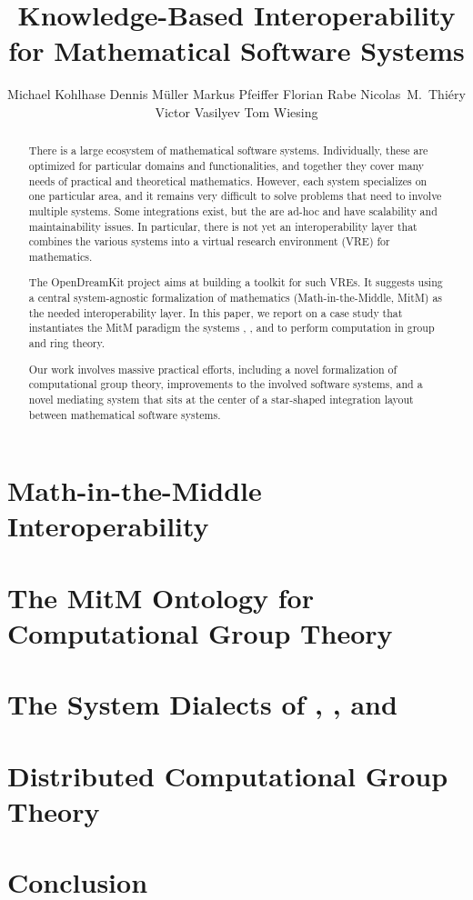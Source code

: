 \documentclass{llncs}
\title{Knowledge-Based Interoperability for Mathematical Software Systems}
\author{
Michael Kohlhase\inst{1} 
Dennis M\"uller\inst{1} 
Markus Pfeiffer\inst{3} 
Florian Rabe\inst{2} 
Nicolas~M.~Thiéry\inst{4} 
Victor Vasilyev\inst{3} 
Tom Wiesing\inst{1}
}
\institute{
   FAU Erlangen-N\"urnberg
   \and Jacobs University Bremen
   \and University of St~Andrews 
   \and Universit\'e Paris-Sud
}
\begin{document}
\maketitle
\begin{abstract}
  There is a large ecosystem of mathematical software systems.
  Individually, these are optimized for particular domains and functionalities, and together they cover many needs of practical and theoretical mathematics.
  However, each system specializes on one particular area, and it remains very difficult to solve problems that need to involve multiple systems.
  Some integrations exist, but the are ad-hoc and have scalability and maintainability issues.
  In particular, there is not yet an interoperability layer that combines the various systems into a virtual research environment (VRE) for
  mathematics.
  
  The OpenDreamKit project aims at building a toolkit for such VREs.
  It suggests using a central system-agnostic formalization of mathematics (Math-in-the-Middle, MitM) as the needed interoperability layer.
  In this paper, we report on  a case study that instantiates the MitM paradigm the
  systems \GAP, \Sage, and \Singular to perform computation in group and ring theory.
 
  Our work involves massive practical efforts, including a novel formalization of computational group theory, improvements to the involved software systems, and a novel mediating system that sits at the center of a star-shaped integration layout between mathematical software systems.
\end{abstract}


\section{Math-in-the-Middle Interoperability}\label{sec:mitm}


\section{The MitM Ontology for Computational Group Theory}\label{sec:cgt}


\section{The System Dialects of \GAP, \Sage, and \Singular}\label{sec:apit}


\section{Distributed Computational Group Theory}\label{sec:case}


\section{Conclusion}\label{sec:concl}
  
  
\printbibliography
\newpage
% 
\end{document}

